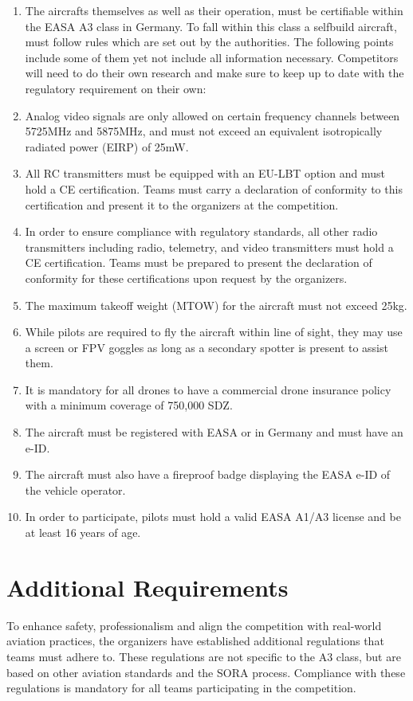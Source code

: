 \documentclass{article}
\begin{document}
\begin{enumerate}
  \item The aircrafts themselves as well as their operation, must be certifiable within the EASA A3 class in Germany. To fall within this class a selfbuild aircraft, must follow rules which are set out by the authorities. 
  The following points include some of them yet not include all information necessary. Competitors will need to do their own research and make sure to keep up to date with the regulatory requirement on their own:
  \item Analog video signals are only allowed on certain frequency channels between 5725MHz and 5875MHz, and must not exceed an equivalent isotropically radiated power (EIRP) of 25mW.
  \item All RC transmitters must be equipped with an EU-LBT option and must hold a CE certification. Teams must carry a declaration of conformity to this certification and present it to the organizers at the competition.
  \item In order to ensure compliance with regulatory standards, all other radio transmitters including radio, telemetry, and video transmitters must hold a CE certification. Teams must be prepared to present the declaration of conformity for these certifications upon request by the organizers.
  \item The maximum takeoff weight (MTOW) for the aircraft must not exceed 25kg.
  \item While pilots are required to fly the aircraft within line of sight, they may use a screen or FPV goggles as long as a secondary spotter is present to assist them.
  \item It is mandatory for all drones to have a commercial drone insurance policy with a minimum coverage of 750,000 SDZ.
  \item The aircraft must be registered with EASA or in Germany and must have an e-ID.
  \item The aircraft must also have a fireproof badge displaying the EASA e-ID of the vehicle operator.
  \item In order to participate, pilots must hold a valid EASA A1/A3 license and be at least 16 years of age.
\end{enumerate}

\section{Additional Requirements}
To enhance safety, professionalism and align the competition with real-world aviation practices, the organizers have established additional regulations that teams must adhere to. These regulations are not specific to the A3 class, but are based on other aviation standards and the SORA process. Compliance with these regulations is mandatory for all teams participating in the competition.
\end{document}
